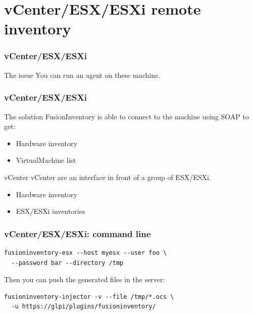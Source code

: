 \documentclass{beamer}
\begin{document}
\section{vCenter/ESX/ESXi remote inventory}


\begin{frame}
    \frametitle{vCenter/ESX/ESXi}

    \begin{block}{The issue}
    You can run an agent on these machine.
    \end{block}


\end{frame}

\begin{frame}
    \frametitle{vCenter/ESX/ESXi}

    \begin{block}{The solution}
FusionInventory is able to connect to the machine using SOAP to get:
        \begin{itemize}
                \item Hardware inventory 
                \item VirtualMachine list
        \end{itemize}
    \end{block}

    \begin{block}{vCenter}
vCenter are an interface in front of a group of ESX/ESXi.
        \begin{itemize}
                \item Hardware inventory 
                \item ESX/ESXi inventories 
        \end{itemize}
    \end{block}
\end{frame}

\begin{frame}[fragile]
    \frametitle{vCenter/ESX/ESXi: command line}

\begin{lstlisting}
fusioninventory-esx --host myesx --user foo \ 
  --password bar --directory /tmp
\end{lstlisting}

Then you can push the generated files in the server:
\begin{lstlisting}
fusioninventory-injector -v --file /tmp/*.ocs \ 
  -u https://glpi/plugins/fusioninventory/
\end{lstlisting}

\end{frame}
\end{document}
